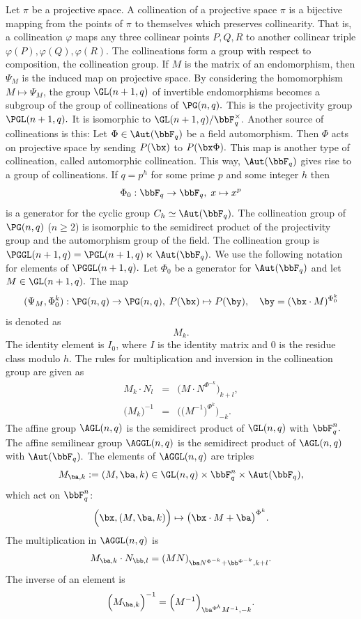 Let $\pi$ be a projective space.
A collineation of a projective space $\pi$ 
is a bijective mapping from the points of $\pi$ to themselves  
which preserves collinearity. That is, a collineation $\varphi$ maps any 
three collinear points $P,Q,R$ 
to another collinear triple $\varphi(P), \varphi(Q), \varphi(R).$ 
The collineations form a group with respect to composition, the collineation group.
If $M$ is the matrix of an endomorphism, then $\Psi_M$ is the induced 
map on projective space. 
By considering the homomorphism $M \mapsto \Psi_M$, 
the group $\GL(n+1,q)$ of invertible endomorphisms becomes 
a subgroup of the group of collineations of $\PG(n,q).$ 
This is the projectivity group $\PGL(n+1,q).$ 
It is isomorphic to $\GL(n+1,q)/\bbF_q^\times.$ 
Another source of collineations is this: 
Let $\Phi \in \Aut(\bbF_q)$ be a field automorphism. Then 
$\Phi$ acts on projective space by sending 
$P(\bx)$ to $P(\bx\Phi).$ 
This map is another type of collineation, 
called automorphic collineation.
This way, $\Aut(\bbF_q)$ gives rise to a group of collineations.
If $q = p^h$ for some prime $p$ and some integer $h$ then 
$$
\Phi_0: \bbF_q \rightarrow \bbF_q, \; x \mapsto x^p
$$ 
is a generator for the cyclic group $C_h \simeq \Aut(\bbF_q).$ 
The collineation group 
of $\PG(n,q)$ ($n \ge 2$) is isomorphic 
to the semidirect product of the projectivity group and the 
automorphism group of the field. 
The collineation group is 
$\PGGL(n+1,q) = \PGL(n+1,q) \ltimes \Aut(\bbF_q).$
We use the following notation for elements of $\PGGL(n+1,q).$ 
Let $\Phi_0$ be a generator 
for $\Aut(\bbF_q)$ and let $M \in \GL(n+1,q).$ 
The map 
$$
(\Psi_M,\Phi_0^k): \PG(n,q) \rightarrow \PG(n,q), \; 
P(\bx) \mapsto P(\by), \quad \by = (\bx \cdot M)^{\Phi_0^k}
$$
is denoted as 
\begin{equation}\label{eqn:Mk}
M_k.
\end{equation}
The identity element is $I_0$, 
where $I$ is the identity matrix and $0$ is the residue class modulo $h.$
The rules for multiplication and inversion in the collineation group are given as
\begin{eqnarray}\label{eqn:MkNl}
M_k \cdot N_l &=& \Big(M \cdot N^{\Phi^{-k}}\Big)_{k+l},\\
\Big(M_k\Big)^{-1} &=& \Big(\Big(M^{-1}\Big)^{\Phi^{k}}\Big)_{-k}.
\end{eqnarray}
The affine group $\AGL(n,q)$ is the semidirect product of $\GL(n,q)$ with $\bbF_q^n.$ 
The affine semilinear group $\AGGL(n,q)$  is the semidirect product of $\AGL(n,q)$ with $\Aut(\bbF_q).$
The elements of $\AGGL(n,q)$ are triples 
$$
M_{\ba,k} := (M, \ba, k) \in \GL(n,q) \times \bbF_q^n \times \Aut(\bbF_q), 
$$
which act on $\bbF_q^n$:
$$
\Big(\bx, (M, \ba, k)\Big) \mapsto \big(\bx \cdot M + \ba\big)^{\Phi^k}.
$$
The multiplication in $\AGGL(n,q)$ is 
$$
M_{\ba,k}  \cdot N_{\bb,l} = (MN)_{\ba N^{\Phi^{-k}}+ \bb^{\Phi^{-k}},k+l}. 
$$
The inverse of an element is 
$$
\Big(M_{\ba,k} \Big)^{-1} = \Big( M^{-1}\Big)_{\ba^{\Phi^{k}} M^{-1},-k}.
$$

